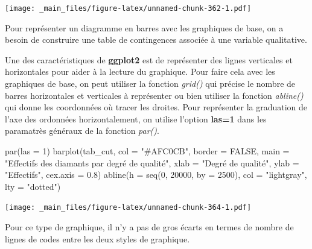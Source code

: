 \documentclass[
]{book}
\newenvironment{Shaded}{\begin{snugshade}}{\end{snugshade}}
\newcommand{\AttributeTok}[1]{\textcolor[rgb]{0.77,0.63,0.00}{#1}}
\newcommand{\ConstantTok}[1]{\textcolor[rgb]{0.00,0.00,0.00}{#1}}
\newcommand{\DecValTok}[1]{\textcolor[rgb]{0.00,0.00,0.81}{#1}}
\newcommand{\FloatTok}[1]{\textcolor[rgb]{0.00,0.00,0.81}{#1}}
\newcommand{\FunctionTok}[1]{\textcolor[rgb]{0.00,0.00,0.00}{#1}}
\newcommand{\NormalTok}[1]{#1}
\newcommand{\OtherTok}[1]{\textcolor[rgb]{0.56,0.35,0.01}{#1}}
\newcommand{\SpecialCharTok}[1]{\textcolor[rgb]{0.00,0.00,0.00}{#1}}
\newcommand{\StringTok}[1]{\textcolor[rgb]{0.31,0.60,0.02}{#1}}
\theoremstyle{definition}
\theoremstyle{definition}
\theoremstyle{definition}
\theoremstyle{definition}
\theoremstyle{remark}
\begin{document}
\texttt{[image: \_main\_files/figure-latex/unnamed-chunk-362-1.pdf]}

Pour représenter un diagramme en barres avec les graphiques de base, on a besoin de construire une table de contingences associée à une variable qualitative.

\begin{Shaded}
\end{Shaded}

Une des caractéristiques de \textbf{ggplot2} est de représenter des lignes verticales et horizontales pour aider à la lecture du graphique. Pour faire cela avec les graphiques de base, on peut utiliser la fonction \emph{grid()} qui précise le nombre de barres horizontales et verticales à représenter ou bien utiliser la fonction \emph{abline()} qui donne les coordonnées où tracer les droites. Pour représenter la graduation de l'axe des ordonnées horizontalement, on utilise l'option \textbf{las=1} dans les paramatrès généraux de la fonction \emph{par()}.

\begin{Shaded}
\begin{Highlighting}[]
\FunctionTok{par}\NormalTok{(}\AttributeTok{las =} \DecValTok{1}\NormalTok{)}
\FunctionTok{barplot}\NormalTok{(tab\_cut,}
        \AttributeTok{col =} \StringTok{"\#AFC0CB"}\NormalTok{,}
        \AttributeTok{border =} \ConstantTok{FALSE}\NormalTok{,}
        \AttributeTok{main =} \StringTok{"Effectifs des diamants par degré de qualité"}\NormalTok{,}
        \AttributeTok{xlab =} \StringTok{"Degré de qualité"}\NormalTok{,}
        \AttributeTok{ylab =} \StringTok{"Effectifs"}\NormalTok{,}
        \AttributeTok{cex.axis =} \FloatTok{0.8}\NormalTok{)}
\FunctionTok{abline}\NormalTok{(}\AttributeTok{h =} \FunctionTok{seq}\NormalTok{(}\DecValTok{0}\NormalTok{, }\DecValTok{20000}\NormalTok{, }\AttributeTok{by =} \DecValTok{2500}\NormalTok{), }\AttributeTok{col =} \StringTok{"lightgray"}\NormalTok{, }\AttributeTok{lty =} \StringTok{"dotted"}\NormalTok{)}
\end{Highlighting}
\end{Shaded}

\texttt{[image: \_main\_files/figure-latex/unnamed-chunk-364-1.pdf]}

Pour ce type de graphique, il n'y a pas de gros écarts en termes de nombre de lignes de codes entre les deux styles de graphique.
\end{document}
